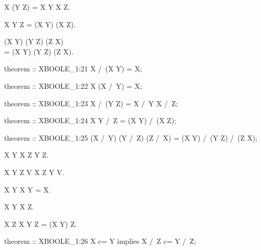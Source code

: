 \begin{paracol}{2}
\begin{theorem}
  X \cap (Y \cup Z) = X \cap Y \cup X \cap Z.
\end{theorem}

\begin{theorem}
  X \cup Y \cap Z = (X \cup Y) \cap (X \cup Z).
\end{theorem}

\begin{theorem+}
  (X \cap Y) \cup (Y \cap Z) \cup (Z \cap X)\\
  = (X \cup Y) \cap (Y \cup Z) \cap (Z \cup X).
\end{theorem+}

\switchcolumn

\begin{mizar}
theorem :: XBOOLE_1:21
  X /\ (X \/ Y) = X;

theorem :: XBOOLE_1:22
  X \/ (X /\ Y) = X;

theorem :: XBOOLE_1:23
  X /\ (Y \/ Z) = X /\ Y \/ X /\ Z;

theorem :: XBOOLE_1:24
  X \/ Y /\ Z = (X \/ Y) /\ (X \/ Z);

theorem :: XBOOLE_1:25
  (X /\ Y) \/ (Y /\ Z) \/ (Z /\ X)
  = (X \/ Y) /\ (Y \/ Z) /\ (Z \/ X);
\end{mizar}

\switchcolumn*\ensurevspace{5cm}

\begin{theorem}
  X \subset Y \implies X \cap Z \subset Y \cap Z.
\end{theorem}

\begin{theorem}
  X \subset Y \land Z \subset V \implies X \cap Z \subset Y \cap V.
\end{theorem}

\begin{theorem}
  X \subset Y \implies X \cap Y = X.
\end{theorem}

\begin{theorem}
  X \cap Y \subset X \cup Z.
\end{theorem}

\begin{theorem}
  X \subset Z \implies X \cup Y \cap Z = (X \cup Y) \cap Z.
\end{theorem}

\switchcolumn

\begin{mizar}
theorem :: XBOOLE_1:26
  X c= Y implies X /\ Z c= Y /\ Z;


\end{mizar}
\end{paracol}
